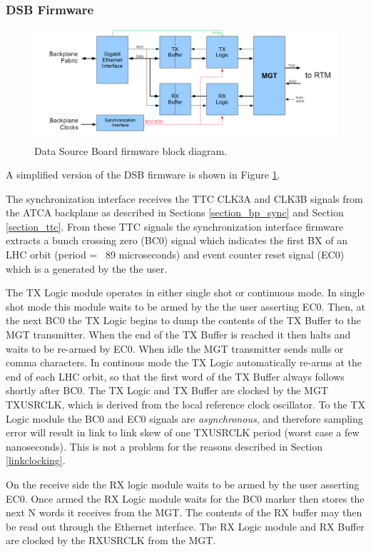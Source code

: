 \documentclass[letterpaper]{article}
\begin{document}
\subsubsection{DSB Firmware}

\begin{figure}
\centering
\includegraphics[width=15cm]{dsb.png}
\caption{Data Source Board firmware block diagram.}
\label{dsb_fw}
\end{figure}

A simplified version of the DSB firmware is shown in Figure \ref{dsb_fw}. 

The synchronization interface receives the TTC CLK3A and CLK3B signals from the ATCA backplane as described in Sections \ref{section_bp_sync} and Section \ref{section_ttc}.  From these TTC signals the synchronization interface firmware extracts a bunch crossing zero (BC0) signal which indicates the first BX of an LHC orbit (period = ~89 microseconds) and event counter reset signal (EC0) which is a generated by the the user.

The TX Logic module operates in either single shot or continuous mode.  In single shot mode this module waits to be armed by the the user asserting EC0.  Then, at the next BC0 the TX Logic begins to dump the contents of the TX Buffer to the MGT transmitter.  When the end of the TX Buffer is reached it then halts and waits to be re-armed by EC0.  When idle the MGT transmitter sends nulls or comma characters.  In continous mode the TX Logic automatically re-arms at the end of each LHC orbit, so that the first word of the TX Buffer always follows shortly after BC0.  The TX Logic and TX Buffer are clocked by the MGT TXUSRCLK, which is derived from the local reference clock oscillator.  To the TX Logic module the BC0 and EC0 signals are \emph{asynchronous}, and therefore sampling error will result in link to link skew of one TXUSRCLK period (worst case a few nanoseconds).  This is not a problem for the reasons described in Section \ref{linkclocking}.

On the receive side the RX logic module waits to be armed by the user asserting EC0.  Once armed the RX Logic module waits for the BC0 marker then stores the next N words it receives from the MGT.  The contents of the RX buffer may then be read out through the Ethernet interface.  The RX Logic module and RX Buffer are clocked by the RXUSRCLK from the MGT.
\end{document}
